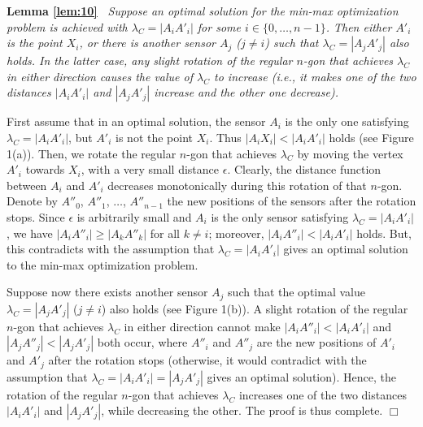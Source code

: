 \documentclass[11pt]{article}
\newenvironment{proof}{\noindent {\textbf{Proof:}}\rm}{\hfill $\Box$
\rm}
\begin{document}
\noindent
{\bf Lemma \ref{lem:10}\ }\cite{ref:TanNe10}
{\em
Suppose an optimal solution for the min-max optimization problem is achieved
with $\lambda_C = |A_{i} A'_{i}|$ for some $i\in \{0,\ldots,
n-1\}$. Then either $A'_{i}$ is the point $X_{i}$, or there is
another sensor $A_{j}$ ($j \neq i$) such that $\lambda_C = |A_{j}
A'_{j}|$ also holds. In the latter case, any slight rotation of the
regular $n$-gon that achieves $\lambda_C$ in either direction
causes the value of $\lambda_C$ to increase (i.e., it makes one of the two
distances $|A_i A'_i|$ and $|A_j A'_j|$ increase and the other one decrease).
}
\vspace{0.15in}

\begin{proof}
First assume that in an optimal solution,
the sensor $A_{i}$ is the only one satisfying $\lambda_C = |A_{i} A'_{i}|$,
but $A'_i$ is not the point $X_{i}$. Thus $|A_{i} X_{i}| < |A_{i}
A'_{i}|$ holds (see Figure 1(a)).
Then, we rotate the regular $n$-gon that achieves $\lambda_C$ by moving
the vertex $A'_{i}$ towards $X_{i}$, with a very small distance $\epsilon$. Clearly,
the distance function between $A_{i}$ and $A'_{i}$ decreases monotonically during
this rotation of that $n$-gon. Denote by $A''_{0}$, $A''_{1}$, $\ldots$, $A''_{n-1}$
the new positions of the sensors after the rotation stops. Since $\epsilon$ is
arbitrarily small and $A_{i}$ is the only sensor satisfying $\lambda_C = |A_{i} A'_{i}|$,
we have $|A_{i} A''_{i}| \geq |A_{k} A''_{k}|$ for all $k \neq i$;
moreover, $|A_{i} A''_{i}| < |A_{i} A'_{i}|$ holds. But, this contradicts with
the assumption that
$\lambda_C = |A_{i} A'_{i}|$ gives an optimal solution to the min-max optimization problem.

Suppose now there exists another sensor $A_j$ such that the optimal value
$\lambda_C = |A_{j} A'_{j}|$ ($j \neq i$) also holds (see Figure 1(b)).
A slight rotation of the regular $n$-gon that achieves $\lambda_C$
in either direction cannot make $|A_{i} A''_{i}| < |A_{i} A'_{i}|$
and $|A_{j} A''_{j}| < |A_{j} A'_{j}|$ both occur, where $A''_i$ and $A''_j$
are the new positions of $A'_i$ and $A'_j$ after the rotation stops
(otherwise, it would contradict with the assumption that $\lambda_C = |A_{i} A'_{i}|=
|A_{j} A'_{j}|$ gives an optimal solution).
Hence, the rotation of the regular $n$-gon that achieves $\lambda_C$
increases one of the two distances
$|A_{i} A'_{i}|$ and $|A_{j} A'_{j}|$, while decreasing the other.
The proof is thus complete.
\end{proof}
\end{document}
